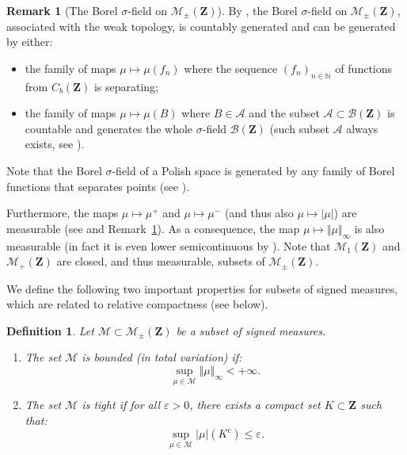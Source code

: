 \documentclass{amsart}
\theoremstyle{plain}
\newtheorem{defin}[Th]{Definition}
\theoremstyle{definition}
\newtheorem{remark}[Th]{Remark}
\newcommand{\Space}{\mathbf{Z}}
\newcommand{\Borel}{\mathcal{B}(\Space)}
\newcommand{\cm}{\mathcal{M}}
\newcommand{\cA}{\mathcal{A}}
\newcommand{\Proba}{\mathcal{M}_1(\Space)}
\newcommand{\Meas}{\mathcal{M}_+(\Space)}
\newcommand{\SignedMeas}{\mathcal{M}_{\pm}(\Space)}
\newcommand{\CbFunct}{C_b(\Space)}
\newcommand{\TotalMass}[1]{\norm{#1}_\infty}
\newcommand{\TM}[1]{\norm{#1}_\infty}
\newcommand{\N}{\mathbb{N}}
\newcommand{\norm}[1]{\Vert#1\Vert}
\begin{document}
\begin{remark}[The Borel $\sigma$-field on $\SignedMeas$]\label{rem:borel_algebra_measures}
By \cite[Corollary 5.1.9]{Bogachev},
the Borel $\sigma$-field on $\SignedMeas$,
associated with the weak topology, is countably generated and
can be generated by either:
\begin{itemize}
\item
the family of maps $\mu \mapsto \mu(f_n)$
	where  the sequence $(f_n)_{n\in\N}$ of functions from $\CbFunct$ is separating;
\item
the family of maps $\mu \mapsto \mu(B)$ where $B\in\cA$ 
and the subset $\cA \subset\Borel$ is countable and generates the whole $\sigma$-field $\Borel$
(such subset $\cA$ always exists, see \cite[Corollary 6.7.5]{BogachevMT2}).
\end{itemize}
Note that the Borel $\sigma$-field of a Polish space is generated by 
	any family of Borel functions that separates points
	(see \cite[Theorem 6.8.9]{BogachevMT2}).
		

 Furthermore, the   maps $\mu   \mapsto  \mu^+$   and  $\mu   \mapsto  \mu^-$   (and  thus   also
$\mu \mapsto \vert\mu\vert$) are measurable 
(see \cite[Theorem~2.8]{MeasurableSetsMeasures} and Remark~\ref{rem:borel_algebra_measures}).
As a consequence, the map $\mu \mapsto \TM{\mu}$ is also measurable
(in fact it is even lower   semicontinuous   by \cite[Theorem~2.7.4]{Bogachev}).
Note that 
$\Proba$ and $\Meas$ are closed, and thus measurable, subsets of $\SignedMeas$.
\end{remark}



We define the following two important properties for subsets of signed measures,
which are related to relative compactness (see  below).
\begin{defin}
  \label{def:tight-bded}
  Let $\cm\subset  \SignedMeas$ be a subset of signed measures.
  \begin{enumerate}[label=(\roman*)]
\item The set  $\cm$ is \emph{bounded}  (in total variation)     
  if:
  \[
    \sup_{\mu\in \cm} \TotalMass{\mu} <+\infty .
  \]
  
  \item The set  $\cm$ is  \emph{tight} if  for all  $\varepsilon>0$, there
exists    a     compact    set     $K\subset    \Space$     such
that:
\[
  \sup_{\mu\in \cm} \vert\mu\vert(K^c)\leq   \varepsilon.
\]
\end{enumerate}
\end{defin}
\end{document}
